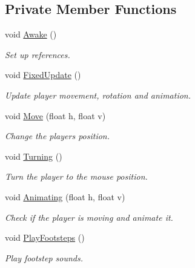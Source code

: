 \subsection*{Private Member Functions}
\begin{DoxyCompactItemize}
\item 
void \mbox{\hyperlink{class_movement_acaad80b2d3b95e5998f7470405b6cad4}{Awake}} ()
\begin{DoxyCompactList}\small\item\em Set up references. \end{DoxyCompactList}\item 
void \mbox{\hyperlink{class_movement_a9687a887cb7ae16793f2fdc42d00d11c}{Fixed\+Update}} ()
\begin{DoxyCompactList}\small\item\em Update player movement, rotation and animation. \end{DoxyCompactList}\item 
void \mbox{\hyperlink{class_movement_abf363d8647ed3dc7882084132b08a32f}{Move}} (float h, float v)
\begin{DoxyCompactList}\small\item\em Change the player\textquotesingle{}s position. \end{DoxyCompactList}\item 
void \mbox{\hyperlink{class_movement_a428972ace717e70397a5825341567a9b}{Turning}} ()
\begin{DoxyCompactList}\small\item\em Turn the player to the mouse position. \end{DoxyCompactList}\item 
void \mbox{\hyperlink{class_movement_a02aa2c49bafdcf2f0493dd1dc4df1e34}{Animating}} (float h, float v)
\begin{DoxyCompactList}\small\item\em Check if the player is moving and animate it. \end{DoxyCompactList}\item 
void \mbox{\hyperlink{class_movement_a2859a517a3eef83923d130787a54599b}{Play\+Footsteps}} ()
\begin{DoxyCompactList}\small\item\em Play footstep sounds. \end{DoxyCompactList}\end{DoxyCompactItemize}
